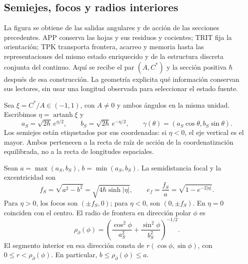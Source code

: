 
\subsection{Semiejes, focos y radios interiores}
\label{sec:ii-elipse-geometria}

La figura se obtiene de las salidas angulares y de acción de las secciones
precedentes. APP conserva las hojas y sus residuos y cocientes; TRIT fija
la orientación; TPK transporta frontera, acarreo y memoria hasta las
representaciones del mismo estado enriquecido y de la estructura discreta
conjunta del continuo. Aquí se recibe el par \((A,C^*)\) y la sección
positiva \(\hbar\) después de esa construcción. La geometría explicita
qué información conservan sus lectores, sin usar una longitud observada
para seleccionar el estado fuente.

Sea \(\xi=C^*/A\in(-1,1)\), con \(A\ne0\) y ambos ángulos en la
misma unidad. Escribimos \(\eta=\operatorname{artanh}\xi\) y
\[
 a_S=\sqrt{2\hbar}\,e^{\eta/2},\qquad
 b_S=\sqrt{2\hbar}\,e^{-\eta/2},\qquad
 \gamma(\theta)=(a_S\cos\theta,b_S\sin\theta).
\]
Los semiejes están etiquetados por sus coordenadas: si \(\eta<0\),
el eje vertical es el mayor. Ambos pertenecen a la recta de raíz de
acción de la coordenatización equilibrada, no a la recta de longitudes espaciales.

\begin{proposition}
\label{prop:ii-elipse-focos}
Sean \(a=\max(a_S,b_S)\), \(b=\min(a_S,b_S)\). La semidistancia
focal y la excentricidad son
\begin{equation}
 f_S=\sqrt{a^2-b^2}
 =\sqrt{4\hbar\sinh|\eta|},\qquad
 e_f=\frac{f_S}{a}=\sqrt{1-e^{-2|\eta|}}.
 \label{eq:ii-elipse-focal}
\end{equation}
Para \(\eta>0\), los focos son \((\pm f_S,0)\); para
\(\eta<0\), son \((0,\pm f_S)\). En \(\eta=0\) coinciden con
el centro. El radio de frontera en dirección polar \(\phi\) es
\begin{equation}
 \rho_{\partial}(\phi)
 =\left(\frac{\cos^2\phi}{a_S^2}
        +\frac{\sin^2\phi}{b_S^2}\right)^{-1/2}.
 \label{eq:ii-elipse-radio-polar}
\end{equation}
El segmento interior en esa dirección consta de
\(r(\cos\phi,\sin\phi)\), con \(0\le r<\rho_{\partial}(\phi)\).
En particular, \(b\le\rho_{\partial}(\phi)\le a\).
\end{proposition}

